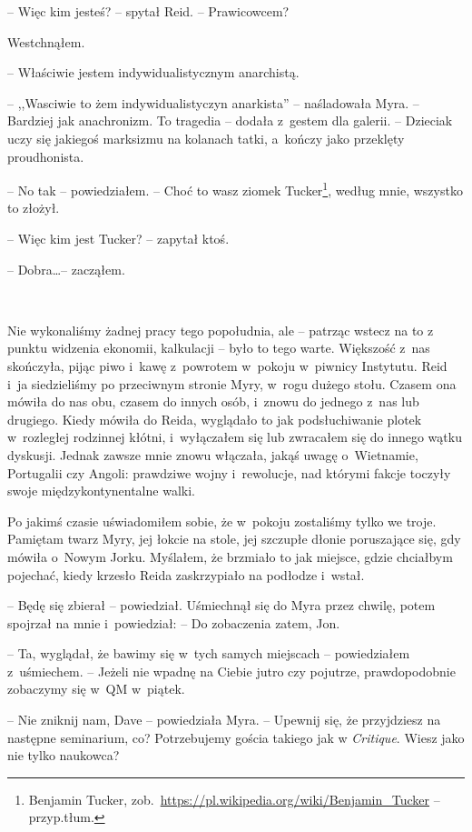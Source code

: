\documentclass[oneside,polish,11pt,sfheadings]{mwbk}
\begin{document}
-- Więc kim jesteś? -- spytał Reid. -- Prawicowcem?

Westchnąłem. 

-- Właściwie jestem indywidualistycznym anarchistą.

-- ,,Wasciwie to żem indywidualistyczyn anarkista'' -- naśladowała Myra. -- Bardziej jak anachronizm. To tragedia -- dodała z~gestem dla galerii. -- Dzieciak uczy się jakiegoś marksizmu na kolanach tatki, a~kończy jako
przeklęty proudhonista.

-- No tak -- powiedziałem. -- Choć to wasz ziomek Tucker\footnote{Benjamin Tucker,
zob.~\url{https://pl.wikipedia.org/wiki/Benjamin_Tucker} -- przyp.tłum.}, według mnie,
wszystko to złożył. 

-- Więc kim jest Tucker? -- zapytał ktoś.

-- Dobra\ldots -- zacząłem.

~

Nie wykonaliśmy żadnej pracy tego popołudnia, ale -- patrząc wstecz na to
z punktu widzenia ekonomii, kalkulacji -- było to tego warte. Większość z~nas skończyła, pijąc piwo i~kawę z~powrotem w~pokoju w~piwnicy
Instytutu. Reid i~ja siedzieliśmy po przeciwnym stronie Myry, w~rogu
dużego stołu. Czasem ona mówiła do nas obu, czasem do innych osób, i~znowu do jednego z~nas lub drugiego. Kiedy mówiła do Reida, wyglądało to
jak podsłuchiwanie plotek w~rozległej rodzinnej kłótni, i~wyłączałem się
lub zwracałem się do innego wątku dyskusji. Jednak zawsze mnie znowu
włączała, jakąś uwagę o~Wietnamie, Portugalii czy Angoli: prawdziwe
wojny i~rewolucje, nad którymi fakcje toczyły swoje międzykontynentalne
walki.

Po jakimś czasie uświadomiłem sobie, że w~pokoju zostaliśmy tylko we
troje. Pamiętam twarz Myry, jej łokcie na stole, jej szczupłe dłonie
poruszające się, gdy mówiła o~Nowym Jorku. Myślałem, że brzmiało to jak
miejsce, gdzie chciałbym pojechać, kiedy krzesło Reida zaskrzypiało na
podłodze i~wstał.

-- Będę się zbierał -- powiedział. Uśmiechnął się do Myra przez chwilę,
potem spojrzał na mnie i~powiedział: -- Do zobaczenia zatem, Jon.

-- Ta, wyglądał, że bawimy się w~tych samych miejscach -- powiedziałem z~uśmiechem. -- Jeżeli nie wpadnę na Ciebie jutro czy pojutrze,
prawdopodobnie zobaczymy się w~QM w~piątek.

-- Nie zniknij nam, Dave -- powiedziała Myra. -- Upewnij się, że
przyjdziesz na następne seminarium, co? Potrzebujemy gościa takiego jak
w \emph{Critique}. Wiesz jako nie tylko naukowca?
\end{document}
